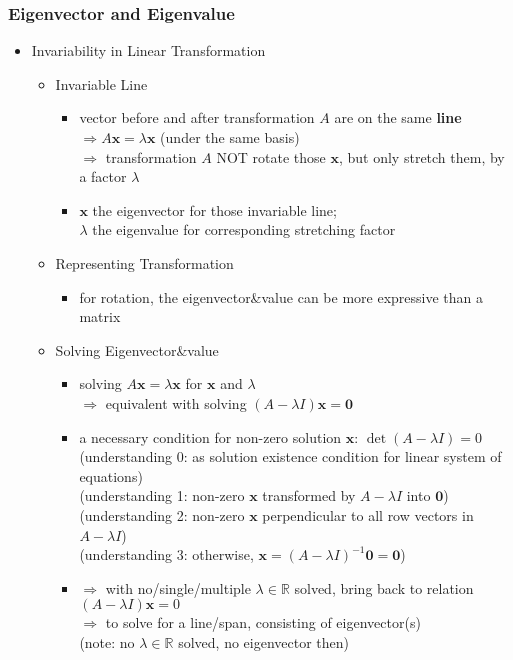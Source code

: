 \subsubsection{Eigenvector and Eigenvalue}
\begin{itemize}
\item Invariability in Linear Transformation
	\begin{itemize}
	\item Invariable Line
		\begin{itemize}
		\item vector before and after transformation $A$ are on the same \textbf{line} \\
		$\Rightarrow A\mathbf x = \lambda\mathbf x$ (under the same basis) \\
		$\Rightarrow$ transformation $A$ NOT rotate those $\mathbf x$, but only stretch them, by a factor $\lambda$
		\item $\mathbf x$ the eigenvector for those invariable line; \\ 
		$\lambda$ the eigenvalue for corresponding stretching factor
		\end{itemize}
	\item Representing Transformation
		\begin{itemize}
		\item for rotation, the eigenvector\&value can be more expressive than a matrix
		\end{itemize}
	\item Solving Eigenvector\&value
		\begin{itemize}
		\item solving $A\mathbf x = \lambda \mathbf x$ for $\mathbf x$ and $\lambda$ \\
		$\Rightarrow$ equivalent with solving $(A-\lambda I)\mathbf x = \mathbf 0$
		\item a necessary condition for non-zero solution $\mathbf x$: $\det (A-\lambda I) = 0$ \\
		(understanding 0: as solution existence condition for linear system of equations) \\
		(understanding 1: non-zero $\mathbf x$ transformed by $A-\lambda I$ into $\mathbf 0$) \\
		(understanding 2: non-zero $\mathbf x$ perpendicular to all row vectors in $A-\lambda I$) \\
		(understanding 3: otherwise, $\mathbf x = (A-\lambda I)^{-1}\mathbf 0 = \mathbf 0$)
		\item $\Rightarrow$ with no/single/multiple $\lambda\in\mathbb R$ solved, bring back to relation $(A-\lambda I)\mathbf x = 0$ \\ 
		$\Rightarrow$ to solve for a line/span, consisting of eigenvector(s) \\ 
		(note: no $\lambda\in\mathbb R$ solved, no eigenvector then)
		\end{itemize}
	\end{itemize}
\end{itemize}

